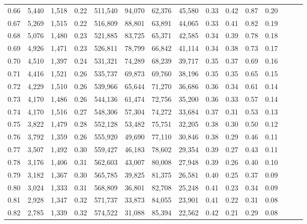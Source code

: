\begin{tabular}{rrrrrrrrrrrrrrr}
0.66 &   5,440 &  1,518 &  0.22 &  511,540 &   94,070 &   62,376 &   45,580 &  0.33 &  0.42 &  0.87 &      0.20 \\
0.67 &   5,269 &  1,515 &  0.22 &  516,809 &   88,801 &   63,891 &   44,065 &  0.33 &  0.41 &  0.82 &      0.19 \\
0.68 &   5,076 &  1,480 &  0.23 &  521,885 &   83,725 &   65,371 &   42,585 &  0.34 &  0.39 &  0.78 &      0.18 \\
0.69 &   4,926 &  1,471 &  0.23 &  526,811 &   78,799 &   66,842 &   41,114 &  0.34 &  0.38 &  0.73 &      0.17 \\
0.70 &   4,510 &  1,397 &  0.24 &  531,321 &   74,289 &   68,239 &   39,717 &  0.35 &  0.37 &  0.69 &      0.16 \\
0.71 &   4,416 &  1,521 &  0.26 &  535,737 &   69,873 &   69,760 &   38,196 &  0.35 &  0.35 &  0.65 &      0.15 \\
0.72 &   4,229 &  1,510 &  0.26 &  539,966 &   65,644 &   71,270 &   36,686 &  0.36 &  0.34 &  0.61 &      0.14 \\
0.73 &   4,170 &  1,486 &  0.26 &  544,136 &   61,474 &   72,756 &   35,200 &  0.36 &  0.33 &  0.57 &      0.14 \\
0.74 &   4,170 &  1,516 &  0.27 &  548,306 &   57,304 &   74,272 &   33,684 &  0.37 &  0.31 &  0.53 &      0.13 \\
0.75 &   3,822 &  1,479 &  0.28 &  552,128 &   53,482 &   75,751 &   32,205 &  0.38 &  0.30 &  0.50 &      0.12 \\
0.76 &   3,792 &  1,359 &  0.26 &  555,920 &   49,690 &   77,110 &   30,846 &  0.38 &  0.29 &  0.46 &      0.11 \\
0.77 &   3,507 &  1,492 &  0.30 &  559,427 &   46,183 &   78,602 &   29,354 &  0.39 &  0.27 &  0.43 &      0.11 \\
0.78 &   3,176 &  1,406 &  0.31 &  562,603 &   43,007 &   80,008 &   27,948 &  0.39 &  0.26 &  0.40 &      0.10 \\
0.79 &   3,182 &  1,367 &  0.30 &  565,785 &   39,825 &   81,375 &   26,581 &  0.40 &  0.25 &  0.37 &      0.09 \\
0.80 &   3,024 &  1,333 &  0.31 &  568,809 &   36,801 &   82,708 &   25,248 &  0.41 &  0.23 &  0.34 &      0.09 \\
0.81 &   2,928 &  1,347 &  0.32 &  571,737 &   33,873 &   84,055 &   23,901 &  0.41 &  0.22 &  0.31 &      0.08 \\
0.82 &   2,785 &  1,339 &  0.32 &  574,522 &   31,088 &   85,394 &   22,562 &  0.42 &  0.21 &  0.29 &      0.08 \\

\end{tabular}
